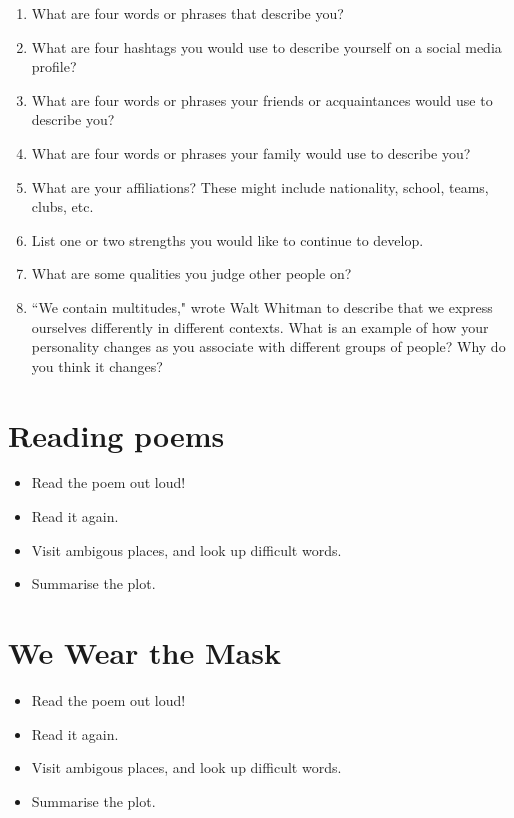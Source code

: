 \documentclass[11pt,a4paper,oneside]{book}
\begin{document}
\begin{enumerate}
\item What are four words or phrases that describe you?
\item What are four hashtags you would use to describe yourself on a social media profile?
\item What are four words or phrases your friends or acquaintances would use to describe you?
\item What are four words or phrases your family would use to describe you?
\item What are your affiliations? These might include nationality, school, teams, clubs, etc.
\item List one or two strengths you would like to continue to develop.
\item What are some qualities you judge other people on?
\item “We contain multitudes," wrote Walt Whitman to describe that we express ourselves
differently in different contexts. What is an example of how your personality changes as you
associate with different groups of people? Why do you think it changes?
\end{enumerate}

\section*{Reading poems}

\begin{itemize}
\item Read the poem out loud!
\item Read it again.
\item Visit ambigous places, and look up difficult words.
\item Summarise the plot.
\end{itemize}

\section*{We Wear the Mask}

\begin{itemize}
\item Read the poem out loud!
\item Read it again.
\item Visit ambigous places, and look up difficult words.
\item Summarise the plot.
\end{itemize}
\end{document}
